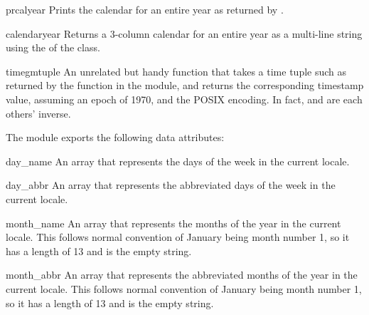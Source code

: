 \begin{funcdesc}{prcal}{year}
Prints the calendar for an entire year as returned by 
.
\end{funcdesc}

\begin{funcdesc}{calendar}{year}
Returns a 3-column calendar for an entire year as a multi-line string
using the  of the  class.
\end{funcdesc}

\begin{funcdesc}{timegm}{tuple}
An unrelated but handy function that takes a time tuple such as
returned by the  function in the 
module, and returns the corresponding \UNIX{} timestamp value, assuming
an epoch of 1970, and the POSIX encoding.  In fact,
 and  are each others' inverse.
\end{funcdesc}

The  module exports the following data attributes:

\begin{datadesc}{day_name}
An array that represents the days of the week in the
current locale.
\end{datadesc}

\begin{datadesc}{day_abbr}
An array that represents the abbreviated days of the week
in the current locale.
\end{datadesc}

\begin{datadesc}{month_name}
An array that represents the months of the year in the
current locale.  This follows normal convention
of January being month number 1, so it has a length of 13 and 
 is the empty string.
\end{datadesc}

\begin{datadesc}{month_abbr}
An array that represents the abbreviated months of the year
in the current locale.  This follows normal convention
of January being month number 1, so it has a length of 13 and 
 is the empty string.
\end{datadesc}

\begin{seealso}
\end{seealso}
